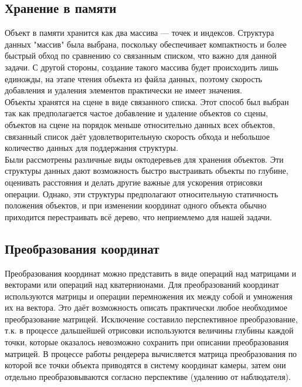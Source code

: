 \documentclass[a4paper,12pt]{report}
\begin{document}
\subsection{Хранение в памяти}
Объект в памяти хранится как два массива --- точек и индексов. Структура данных "массив" была выбрана, поскольку обеспечивает компактность и более быстрый обход по сравнению со связанным списком, что важно для данной задачи. С другой стороны, создание такого массива будет происходить лишь единожды, на этапе чтения объекта из файла данных, поэтому скорость добавления и удаления элементов практически не имеет значения. \\
Объекты хранятся на сцене в виде связанного списка. Этот способ был выбран так как предполагается частое добавление и удаление объектов со сцены, объектов на сцене на порядок меньше относительно данных всех объектов, связанный список даёт удовлетворительную скорость обхода и небольшое количество данных для поддержания структуры. \\
Были рассмотрены различные виды октодеревьев для хранения объектов. Эти структуры данных дают возможность быстро выстраивать объекты по глубине, оценивать расстояния и делать другие важные для ускорения отрисовки операции. Однако, эти структуры предполагают относительную статичность положения объектов, и при изменении координат одного объекта обычно приходится перестраивать всё дерево, что неприемлемо для нашей задачи.

\subsection{Преобразования координат}
Преобразования координат можно представить в виде операций над матрицами и векторами или операций над кватернионами. Для преобразований координат используются матрицы и операции перемножения их между собой и умножения их на вектора. Это даёт возможность описать практически любое необходимое преобразование матрицей. Исключение составило перспективное преобразование, т.к. в процессе дальшейшей отрисовки используются величины глубины каждой точки, которые оказалось невозможно сохранить при описании преобразования матрицей. В процессе работы рендерера вычисляется матрица преобразования по которой все точки объекта приводятся в систему координат камеры, затем они отдельно преобразовываются согласно перспективе (удалению от наблюдателя).
\end{document}
